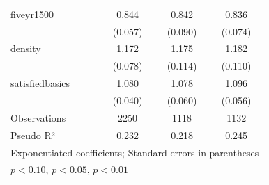 \begin{table}[htbp]
\begin{tabular}{l*{3}{c}}
\addlinespace
fiveyr1500  &       0.844\sym{**} &       0.842         &       0.836\sym{**} \\
            &     (0.057)         &     (0.090)         &     (0.074)         \\
\addlinespace
density     &       1.172\sym{**} &       1.175\sym{*}  &       1.182\sym{*}  \\
            &     (0.078)         &     (0.114)         &     (0.110)         \\
\addlinespace
satisfiedbasics&       1.080\sym{**} &       1.078         &       1.096\sym{*}  \\
            &     (0.040)         &     (0.060)         &     (0.056)         \\
\midrule
Observations&        2250         &        1118         &        1132         \\
Pseudo R²  &       0.232         &       0.218         &       0.245         \\
\bottomrule
\multicolumn{4}{l}{\footnotesize Exponentiated coefficients; Standard errors in parentheses}\\
\multicolumn{4}{l}{\footnotesize \sym{*} \(p<0.10\), \sym{**} \(p<0.05\), \sym{***} \(p<0.01\)}\\
\end{tabular}
\end{table}
